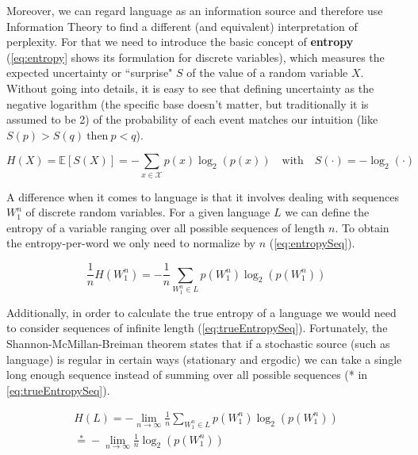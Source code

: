 Moreover, we can regard language as an information source and therefore use Information Theory to find a different (and equivalent) interpretation of perplexity. For that we need to introduce the basic concept of \textbf{entropy} (\autoref{eq:entropy} shows its formulation for discrete variables), which measures the expected uncertainty or ``surprise" $S$ of the value of a random variable $X$. Without going into details, it is easy to see that defining uncertainty as the negative logarithm (the specific base doesn't matter, but traditionally it is assumed to be 2) of the probability of each event matches our intuition (like $S(p)>S(q) \ \text{then} \ p<q$).

\begin{equation} \label{eq:entropy}
	H(X)=\mathbb{E}[S(X)]=-\sum_{x \in \mathcal{X}}p(x)\log_2(p(x)) \quad \text{with} \quad S(\cdot)=-\log_2(\cdot)
\end{equation}

A difference when it comes to language is that it involves dealing with sequences $W_1^n$ of discrete random variables. For a given language $L$ we can define the entropy of a variable ranging over all possible sequences of length $n$. To obtain the entropy-per-word we only need to normalize by $n$ (\autoref{eq:entropySeq}).

\begin{equation} \label{eq:entropySeq}
	\frac{1}{n} H(W_1^n) = -\frac{1}{n}\sum_{W_1^n \in L}p(W_1^n)\log_2(p(W_1^n))
\end{equation}

Additionally, in order to calculate the true entropy of a language we would need to consider sequences of infinite length (\autoref{eq:trueEntropySeq}). Fortunately, the Shannon-McMillan-Breiman theorem states that if a stochastic source (such as language) is regular in certain ways (stationary and ergodic) we can take a single long enough sequence instead of summing over all possible sequences (* in \autoref{eq:trueEntropySeq}).

\begin{equation} \label{eq:trueEntropySeq}
	\begin{gathered}
		H(L) = -\lim\limits_{n \rightarrow \infty}\frac{1}{n}\sum_{W_1^n \in L}p(W_1^n)\log_2(p(W_1^n))\\
		\stackrel{*}{=} -\lim\limits_{n \rightarrow \infty}\frac{1}{n}\log_2(p(W_1^n))
	\end{gathered}
\end{equation}

